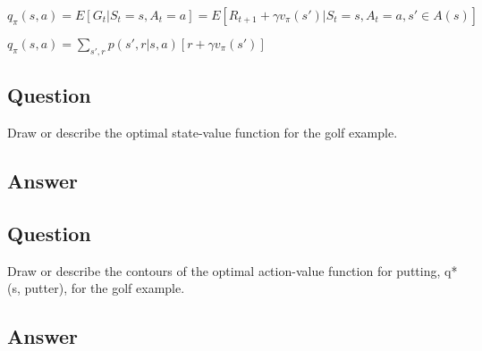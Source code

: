 \documentclass[11pt]{article}
\begin{document}
    $ q_{\pi}(s, a) = E[G_{t}|S_{t}=s, A_{t}=a] = E[R_{t+1} + \gamma v_{\pi}(s') |S_{t}=s, A_{t}=a, s' \in A(s)] $

    $ q_{\pi}(s, a) = \sum_{s',r} p(s', r | s, a) [r + \gamma v_{\pi}(s')] $

    \subsection{Question}

    Draw or describe the optimal state-value function for the golf example.

    \subsection*{Answer}



    \subsection{Question}

    Draw or describe the contours of the optimal action-value function for putting, q* (s, putter), for the golf example.

    \subsection*{Answer}
\end{document}
